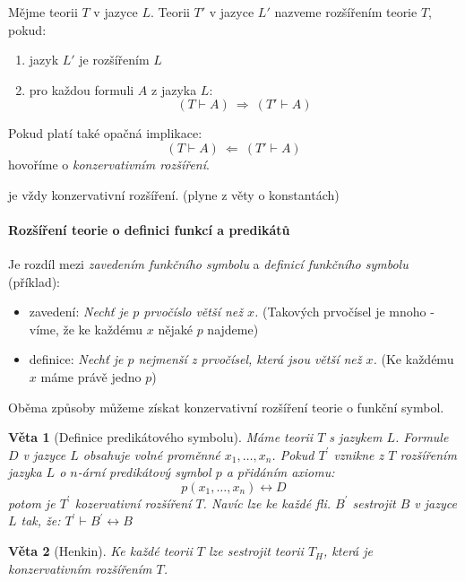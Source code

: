 \documentclass[a4paper]{article}      %
\newtheorem{theorem}{Věta}[section]
\newenvironment{definition}[1][Definice]{\begin{trivlist}
\item[\hskip \labelsep {\bfseries #1}]}{\end{trivlist}}
\newenvironment{remark}[1][Pozorování]{\begin{trivlist}
\item[\hskip \labelsep {\bfseries #1}]}{\end{trivlist}}
\begin{document}
\begin{definition}[Rozšíření teorie]
Mějme teorii $T$ v jazyce $L$. Teorii $T'$ v jazyce $L'$ nazveme rozšířením teorie $T$, pokud:
\begin{enumerate}
\item jazyk $L'$ je rozšířením $L$
\item pro každou formuli $A$ z jazyka $L$:
\[
(T \vdash A)\ \Rightarrow\ (T' \vdash A)
\]  
\end{enumerate}
Pokud platí také opačná implikace:
\[
(T \vdash A)\ \Leftarrow\ (T' \vdash A)
\]
hovoříme o \emph{konzervativním rozšíření}.
\end{definition}

\begin{remark}[Rozšíření o konstantní symbol]
je vždy konzervativní rozšíření. (plyne z věty o konstantách)
\end{remark}

\paragraph{Rozšíření teorie o definici funkcí a predikátů}
Je rozdíl mezi \emph{zavedením funkčního symbolu} a \emph{definicí funkčního symbolu} (příklad):
\begin{itemize}
\item zavedení: \emph{Nechť je $p$ prvočíslo větší než $x$.} (Takových prvočísel je mnoho - víme, že ke každému $x$ nějaké $p$ najdeme)
\item definice: \emph{Nechť je $p$ nejmenší z prvočísel, která jsou větší než $x$.} (Ke každému $x$ máme právě jedno $p$)
\end{itemize}
Oběma způsoby můžeme získat konzervativní rozšíření teorie o funkční symbol.

\begin{theorem}[Definice predikátového symbolu]
Máme teorii $T$ s jazykem $L$. Formule $D$ v jazyce $L$ obsahuje volné proměnné $x_1,\ldots,x_n$. Pokud $T^{'}$ vznikne z $T$
rozšířením jazyka $L$ o $n$-ární predikátový symbol $p$ a přidáním axiomu:
\[
p(x_1,\ldots,x_n) \leftrightarrow D
\]
potom je $T^{'}$ kozervativní rozšíření $T$. Navíc lze ke každé fli. $B^{'}$ sestrojit $B$ v jazyce $L$ tak, že: $T^{'} \vdash B^{'} \leftrightarrow B$
\end{theorem}

\begin{theorem}[Henkin]
Ke každé teorii $T$ lze sestrojit teorii $T_{H}$, která je konzervativním rozšířením $T$.
\end{theorem}
\end{document}
